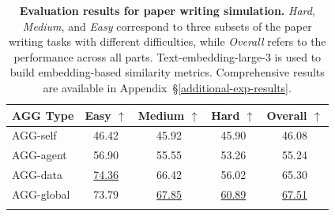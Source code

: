 \begin{table}[t]
\centering
\small
\caption{\textbf{Evaluation results for paper writing simulation.} \textit{Hard}, \textit{Medium}, and \textit{Easy} correspond to three subsets of the paper writing tasks with different difficulties, while \textit{Overall} refers to the performance across all parts. Text-embedding-large-3 is used to build embedding-based similarity metrics. Comprehensive results are available in Appendix~\S\ref{additional-exp-results}.}
\begin{tabular}{lcccc}
\toprule[1pt] 
\textbf{AGG Type} & \textbf{Easy} $\uparrow$ & \textbf{Medium} $\uparrow$ & \textbf{Hard} $\uparrow$ & \textbf{Overall} $\uparrow$ \\
\midrule
AGG-self       & 46.42 & 45.92 & 45.90 & 46.08 \\
AGG-agent      & 56.90 & 55.55 & 53.26 & 55.24 \\
AGG-data       & \underline{74.36} & 66.42 & 56.02 & 65.30 \\
\midrule
AGG-global     & 73.79 & \underline{67.85} & \underline{60.89} & \underline{67.51} \\
\bottomrule[1pt]
\vspace{-5mm}
\end{tabular}
\label{tab:paper-writing-result}
\end{table}

